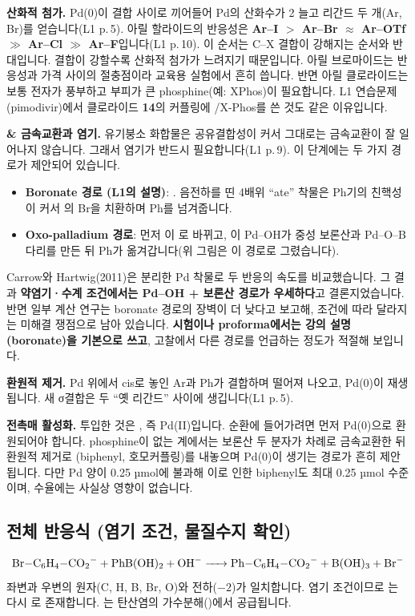 \documentclass[10pt,a4paper]{article}
\begin{document}
\textbf{ 산화적 첨가.} Pd(0)이  결합 사이로 끼어들어 Pd의 산화수가 2 늘고 리간드 두 개(Ar, Br)를 얻습니다(L1 p.\,5). 아릴 할라이드의 반응성은 \textbf{Ar--I $>$ Ar--Br $\approx$ Ar--OTf $\gg$ Ar--Cl $\gg$ Ar--F}입니다(L1 p.\,10). 이 순서는 C--X 결합이 강해지는 순서와 반대입니다. 결합이 강할수록 산화적 첨가가 느려지기 때문입니다. 아릴 브로마이드는 반응성과 가격 사이의 절충점이라 교육용 실험에서 흔히 씁니다. 반면 아릴 클로라이드는 보통 전자가 풍부하고 부피가 큰 phosphine(예: XPhos)이 필요합니다. L1 연습문제(pimodivir)에서 클로라이드 \textbf{14}의 커플링에 /X-Phos를 쓴 것도 같은 이유입니다.

\textbf{ \&  금속교환과 염기.} 유기붕소 화합물은 공유결합성이 커서 그대로는 금속교환이 잘 일어나지 않습니다. 그래서 염기가 반드시 필요합니다(L1 p.\,9). 이 단계에는 두 가지 경로가 제안되어 있습니다.
\begin{itemize}[leftmargin=5mm,itemsep=0.5mm,topsep=0.5mm]
\item \textbf{Boronate 경로 (L1의 설명)}: . 음전하를 띤 4배위 ``ate'' 착물은 Ph기의 친핵성이 커서 의 Br을 치환하며 Ph를 넘겨줍니다.
\item \textbf{Oxo-palladium 경로}: 먼저 이 로 바뀌고, 이 Pd--OH가 중성 보론산과 Pd--O--B 다리를 만든 뒤 Ph가 옮겨갑니다(위 그림은 이 경로로 그렸습니다).
\end{itemize}
Carrow와 Hartwig(2011)은 분리한 Pd 착물로 두 반응의 속도를 비교했습니다. 그 결과 \textbf{약염기·수계 조건에서는 Pd--OH + 보론산 경로가 우세하다}고 결론지었습니다. 반면 일부 계산 연구는 boronate 경로의 장벽이 더 낮다고 보고해, 조건에 따라 달라지는 미해결 쟁점으로 남아 있습니다. \textbf{시험이나 proforma에서는 강의 설명(boronate)을 기본으로 쓰고}, 고찰에서 다른 경로를 언급하는 정도가 적절해 보입니다.

\textbf{ 환원적 제거.} Pd 위에서 cis로 놓인 Ar과 Ph가 결합하며 떨어져 나오고, Pd(0)이 재생됩니다. 새 σ결합은 두 ``옛 리간드'' 사이에 생깁니다(L1 p.\,5).

\textbf{전촉매 활성화.} 투입한 것은 , 즉 Pd(II)입니다. 순환에 들어가려면 먼저 Pd(0)으로 환원되어야 합니다. phosphine이 없는 계에서는 보론산 두 분자가 차례로 금속교환한 뒤 환원적 제거로 (biphenyl, 호모커플링)를 내놓으며 Pd(0)이 생기는 경로가 흔히 제안됩니다. 다만 Pd 양이 0.25 µmol에 불과해 이로 인한 biphenyl도 최대 0.25 µmol 수준이며, 수율에는 사실상 영향이 없습니다.

\subsection*{전체 반응식 (염기 조건, 물질수지 확인)}
\[
\ce{Br-C6H4-CO2^- + PhB(OH)2 + OH^- -> Ph-C6H4-CO2^- + B(OH)3 + Br^-}
\]
{\small 좌변과 우변의 원자(C, H, B, Br, O)와 전하($-2$)가 일치합니다. 염기 조건이므로 는 다시 로 존재합니다. 는 탄산염의 가수분해()에서 공급됩니다.}
\end{document}
